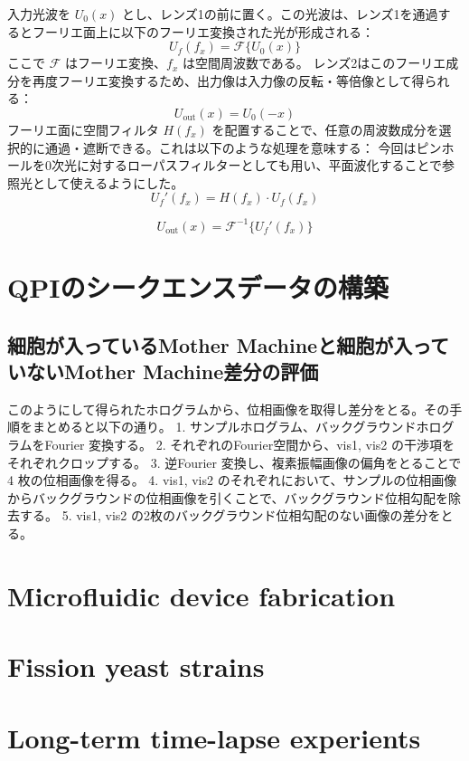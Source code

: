 入力光波を $U_0(x)$ とし、レンズ1の前に置く。この光波は、レンズ1を通過するとフーリエ面上に以下のフーリエ変換された光が形成される：
\begin{equation}
U_f(f_x) = \mathcal{F}\{ U_0(x) \}
\end{equation}
ここで $\mathcal{F}$ はフーリエ変換、$f_x$ は空間周波数である。
レンズ2はこのフーリエ成分を再度フーリエ変換するため、出力像は入力像の反転・等倍像として得られる：
\begin{equation}
U_{\text{out}}(x) = U_0(-x)
\end{equation}
フーリエ面に空間フィルタ $H(f_x)$ を配置することで、任意の周波数成分を選択的に通過・遮断できる。これは以下のような処理を意味する：
今回はピンホールを0次光に対するローパスフィルターとしても用い、平面波化することで参照光として使えるようにした。
\begin{equation}
U_f'(f_x) = H(f_x) \cdot U_f(f_x)
\end{equation}

\begin{equation}
U_{\text{out}}(x) = \mathcal{F}^{-1} \{ U_f'(f_x) \}
\end{equation}

\section{QPIのシークエンスデータの構築}
\subsection{細胞が入っているMother Machineと細胞が入っていないMother Machine差分の評価}
このようにして得られたホログラムから、位相画像を取得し差分をとる。その手順をまとめると以下の通り。
1. サンプルホログラム、バックグラウンドホログラムをFourier 変換する。
2. それぞれのFourier空間から、vis1, vis2 の干渉項をそれぞれクロップする。
3. 逆Fourier 変換し、複素振幅画像の偏角をとることで4 枚の位相画像を得る。
4. vis1, vis2 のそれぞれにおいて、サンプルの位相画像からバックグラウンドの位相画像を引くことで、バックグラウンド位相勾配を除去する。
5. vis1, vis2 の2枚のバックグラウンド位相勾配のない画像の差分をとる。

\section{Microfluidic device fabrication}
\section{Fission yeast strains}
\section{Long-term time-lapse experients}
